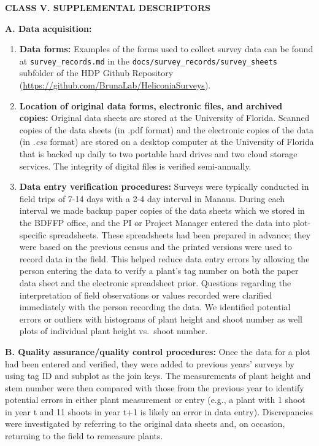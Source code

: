 \documentclass[
  12pt,
  man, donotrepeattitle,floatsintext]{apa6}
\begin{document}
\noindent
\textbf{CLASS V. SUPPLEMENTAL DESCRIPTORS}

\noindent  
\textbf{A. Data acquisition:}

\begin{enumerate}
\def\labelenumi{\arabic{enumi}.}
\item
  \textbf{Data forms:} Examples of the forms used to collect survey data can be found at \texttt{survey\_records.md} in the \texttt{docs/survey\_records/survey\_sheets} subfolder of the HDP Github Repository (\url{https://github.com/BrunaLab/HeliconiaSurveys}).
\item
  \textbf{Location of original data forms, electronic files, and archived copies:} Original data sheets are stored at the University of Florida. Scanned copies of the data sheets (in .pdf format) and the electronic copies of the data (in \emph{.csv} format) are stored on a desktop computer at the University of Florida that is backed up daily to two portable hard drives and two cloud storage services. The integrity of digital files is verified semi-annually.
\item
  \textbf{Data entry verification procedures:} Surveys were typically conducted in field trips of 7-14 days with a 2-4 day interval in Manaus. During each interval we made backup paper copies of the data sheets which we stored in the BDFFP office, and the PI or Project Manager entered the data into plot-specific spreadsheets. These spreadsheets had been prepared in advance; they were based on the previous census and the printed versions were used to record data in the field. This helped reduce data entry errors by allowing the person entering the data to verify a plant's tag number on both the paper data sheet and the electronic spreadsheet prior. Questions regarding the interpretation of field observations or values recorded were clarified immediately with the person recording the data. We identified potential errors or outliers with histograms of plant height and shoot number as well plots of individual plant height vs.~shoot number.
\end{enumerate}

\noindent
\textbf{B. Quality assurance/quality control procedures:} Once the data for a plot had been entered and verified, they were added to previous years' surveys by using tag ID and subplot as the join keys. The measurements of plant height and stem number were then compared with those from the previous year to identify potential errors in either plant measurement or entry (e.g., a plant with 1 shoot in year t and 11 shoots in year t+1 is likely an error in data entry). Discrepancies were investigated by referring to the original data sheets and, on occasion, returning to the field to remeasure plants.
\end{document}
